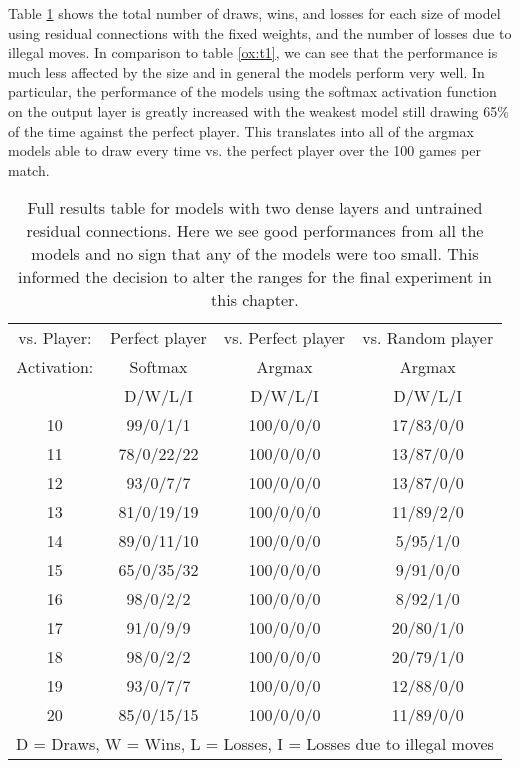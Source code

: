 \documentclass{somasmsc}
\begin{document}
\begin{exa}
Table \ref{ox:t2} shows the total number of draws, wins, and losses for each size of model using residual connections with the fixed weights, and the number of losses due to illegal moves. In comparison to table \ref{ox:t1}, we can see that the performance is much less affected by the size and in general the models perform very well. In particular, the performance of the models using the softmax activation function on the output layer is greatly increased with the weakest model still drawing 65\% of the time against the perfect player. This translates into all of the argmax models able to draw every time vs. the perfect player over the 100 games per match.

\begin{table}[h!]
\centering
\begin{tabular}{ |c|c|c|c| }
 \hline
  vs. Player: & Perfect player & vs. Perfect player & vs. Random player \\
  Activation: & Softmax & Argmax & Argmax \\
  & D/W/L/I & D/W/L/I & D/W/L/I \\
 \hline
 10 & 99/0/1/1   & 100/0/0/0 & 17/83/0/0 \\
 11 & 78/0/22/22 & 100/0/0/0 & 13/87/0/0 \\
 12 & 93/0/7/7   & 100/0/0/0 & 13/87/0/0 \\
 13 & 81/0/19/19 & 100/0/0/0 & 11/89/2/0 \\
 14 & 89/0/11/10 & 100/0/0/0 & 5/95/1/0  \\
 15 & 65/0/35/32 & 100/0/0/0 & 9/91/0/0  \\
 16 & 98/0/2/2   & 100/0/0/0 & 8/92/1/0  \\
 17 & 91/0/9/9   & 100/0/0/0 & 20/80/1/0 \\
 18 & 98/0/2/2   & 100/0/0/0 & 20/79/1/0 \\
 19 & 93/0/7/7   & 100/0/0/0 & 12/88/0/0 \\
 20 & 85/0/15/15 & 100/0/0/0 & 11/89/0/0 \\
 \hline
 \multicolumn{4}{|c|}{D = Draws, W = Wins, L = Losses, I = Losses due to illegal moves} \\
 \hline
\end{tabular}
\caption{Full results table for models with two dense layers and untrained residual connections. Here we see good performances from all the models and no sign that any of the models were too small. This informed the decision to alter the ranges for the final experiment in this chapter.}
\label{ox:t2}
\end{table}


\end{exa}
\end{document}
